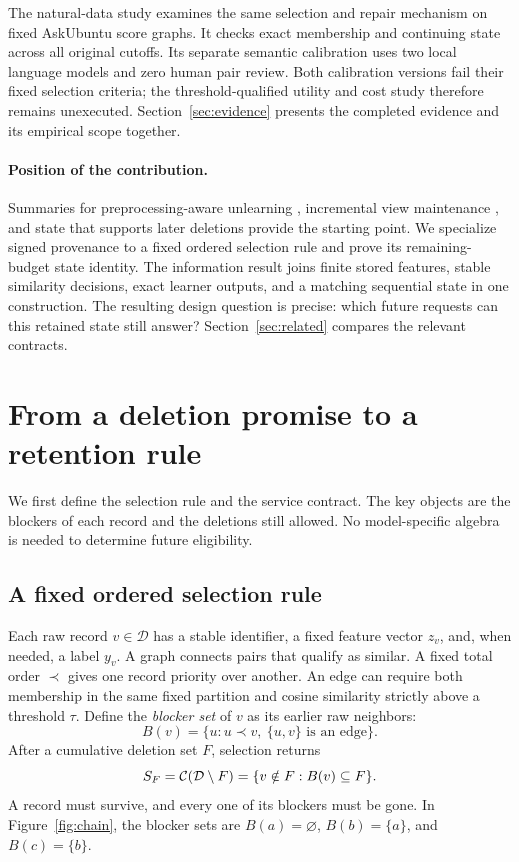 The natural-data study examines the same selection and repair mechanism on
fixed AskUbuntu score graphs. It checks exact membership and continuing
state across all original cutoffs. Its separate semantic calibration uses
two local language models and zero human pair review. Both calibration
versions fail their fixed selection criteria; the threshold-qualified
utility and cost study therefore remains unexecuted. Section~\ref{sec:evidence}
presents the completed evidence and its empirical scope together.

\paragraph{Position of the contribution.}
Summaries for preprocessing-aware unlearning \citep{cao}, incremental view
maintenance \citep{ivmunlearning}, and state that supports later deletions
\citep{ginart,cohencontrol} provide the starting point. We specialize signed
provenance \citep{green,aggregate} to a fixed ordered selection rule and
prove its remaining-budget state identity. The information result joins
finite stored features, stable similarity decisions, exact learner outputs,
and a matching sequential state in one construction. The resulting design
question is precise: which future requests can this retained state still
answer? Section~\ref{sec:related} compares the relevant contracts.

\section{From a deletion promise to a retention rule}\label{sec:setup}
We first define the selection rule and the service contract. The key
objects are the blockers of each record and the deletions still allowed.
No model-specific algebra is needed to determine future eligibility.

\subsection{A fixed ordered selection rule}
Each raw record $v\in\mathcal D$ has a stable identifier, a fixed feature
vector $z_v$, and, when needed, a label $y_v$. A graph connects pairs that
qualify as similar. A fixed total order $\prec$ gives one record priority
over another. An edge can require both membership in the same fixed
partition and cosine similarity strictly above a threshold $\tau$.
Define the \emph{blocker set} of $v$ as its earlier raw neighbors:
\[
                  B(v)=\{u:u\prec v,\ \{u,v\}\text{ is an edge}\}.
\]
After a cumulative deletion set $F$, selection returns
\begin{equation}\label{eq:activation}
 S_F=\mathcal C(\mathcal D\setminus F)=\{v\notin F:B(v)\subseteq F\}.
\end{equation}
A record must survive, and every one of its blockers must be gone.
In Figure~\ref{fig:chain}, the blocker sets are
$B(a)=\varnothing$, $B(b)=\{a\}$, and $B(c)=\{b\}$.

